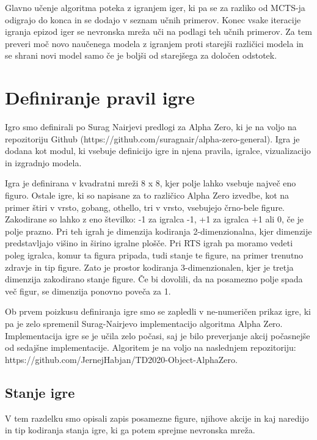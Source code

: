 \documentclass[a4paper, 12pt]{book}
\begin{document}
Glavno učenje algoritma poteka z igranjem iger, ki pa se za razliko od MCTS-ja odigrajo do konca in se dodajo v seznam učnih primerov.
Konec vsake iteracije igranja epizod iger se nevronska mreža uči na podlagi teh učnih primerov.
Za tem preveri moč novo naučenega modela z igranjem proti starejši različici modela in se shrani novi model samo če je boljši od starejšega za določen odstotek.


\chapter{Definiranje pravil igre}
\label{chpravilaigre}

Igro smo definirali po Surag Nairjevi predlogi za Alpha Zero, ki je na voljo na repozitoriju Github (https://github.com/suragnair/alpha-zero-general).
Igra je dodana kot modul, ki vsebuje definicijo igre in njena pravila, igralce, vizualizacijo in izgradnjo modela.

Igra je definirana v kvadratni mreži 8 x 8, kjer polje lahko vsebuje največ eno figuro.
Ostale igre, ki so napisane za to različico Alpha Zero izvedbe, kot na primer štiri v vrsto, gobang, othello, tri v vrsto, vsebujejo črno-bele figure.
Zakodirane so lahko z eno številko: -1 za igralca -1, +1 za igralca +1 ali 0, če je polje prazno.
Pri teh igrah je dimenzija kodiranja 2-dimenzionalna, kjer dimenzije predstavljajo višino in širino igralne plošče.
Pri RTS igrah pa moramo vedeti poleg igralca, komur ta figura pripada, tudi stanje te figure, na primer trenutno zdravje in tip figure.
Zato je prostor kodiranja 3-dimenzionalen, kjer je tretja dimenzija zakodirano stanje figure.
Če bi dovolili, da na posamezno polje spada več figur, se dimenzija ponovno poveča za 1.



Ob prvem poizkusu definiranja igre smo se zapledli v ne-numeričen prikaz igre, ki pa je zelo spremenil Surag-Nairjevo implementacijo algoritma Alpha Zero.
Implementacija igre se je učila zelo počasi, saj je bilo preverjanje akcij počasnejše od sedajšne implementacije.
Algoritem je na voljo na naslednjem repozitoriju:\\
https://github.com/JernejHabjan/TD2020-Object-AlphaZero.




\section{Stanje igre}
V tem razdelku smo opisali zapis posamezne figure, njihove akcije in kaj naredijo in tip kodiranja stanja igre, ki ga potem sprejme nevronska mreža.
\end{document}
